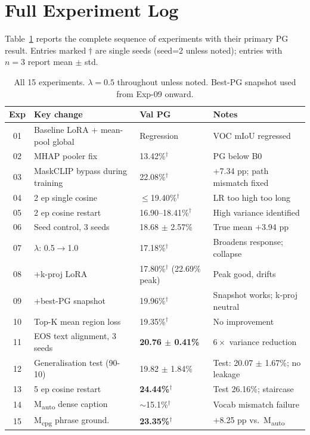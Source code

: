 \documentclass{article}
\begin{document}
\FloatBarrier
\appendix

\section{Full Experiment Log}
\label{app:explog}

Table~\ref{tab:allexps} reports the complete sequence of experiments with their
primary PG result. Entries marked $\dagger$ are single seeds (seed=2 unless
noted); entries with $n=3$ report mean $\pm$ std.

\begin{table}[H]
\centering
\caption{All 15 experiments. $\lambda=0.5$ throughout unless noted. Best-PG
snapshot used from Exp-09 onward.}
\label{tab:allexps}
\setlength{\tabcolsep}{4pt}
\begin{tabular}{clll}
\toprule
Exp & Key change & Val PG & Notes \\
\midrule
01 & Baseline LoRA + mean-pool global & Regression & VOC mIoU regressed \\
02 & MHAP pooler fix & 13.42\%$^\dagger$ & PG below B0 \\
03 & MaskCLIP bypass during training & 22.08\%$^\dagger$ & +7.34 pp; path mismatch fixed \\
04 & 2 ep single cosine & $\leq$19.40\%$^\dagger$ & LR too high too long \\
05 & 2 ep cosine restart & 16.90--18.41\%$^\dagger$ & High variance identified \\
06 & Seed control, 3 seeds & 18.68 $\pm$ 2.57\% & True mean +3.94 pp \\
07 & $\lambda$: 0.5$\to$1.0 & 17.18\%$^\dagger$ & Broadens response; collapse \\
08 & +k-proj LoRA & 17.80\%$^\dagger$ (22.69\% peak) & Peak good, drifts \\
09 & +best-PG snapshot & 19.96\%$^\dagger$ & Snapshot works; k-proj neutral \\
10 & Top-K mean region loss & 19.35\%$^\dagger$ & No improvement \\
11 & EOS text alignment, 3 seeds & \textbf{20.76 $\pm$ 0.41\%} & $6\times$ variance reduction \\
12 & Generalisation test (90-10) & 19.82 $\pm$ 1.84\% & Test: 20.07 $\pm$ 1.67\%; no leakage \\
13 & 5 ep cosine restart & \textbf{24.44\%}$^\dagger$ & Test 26.16\%; staircase \\
14 & M\textsubscript{auto} dense caption & $\sim$15.1\%$^\dagger$ & Vocab mismatch failure \\
15 & M\textsubscript{cpg} phrase ground. & \textbf{23.35\%}$^\dagger$ & +8.25 pp vs.\ M\textsubscript{auto} \\
\bottomrule
\end{tabular}
\end{table}
\end{document}
